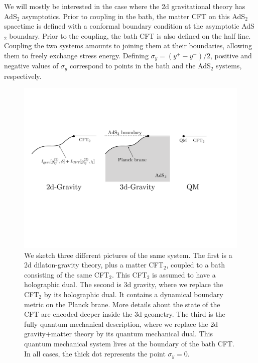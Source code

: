 \documentclass[12pt]{article}
\begin{document}
We will mostly be interested in the case where the 2d gravitational theory has AdS$_2$ asymptotics.
Prior to coupling in the bath, the matter CFT on this AdS$_2$ spacetime is defined with a conformal boundary condition at the asymptotic AdS$_2$ boundary. 
Prior to the coupling, the bath CFT is also defined on the half line. 
Coupling the two systems amounts to joining them at their boundaries, allowing them to freely exchange stress energy. 
Defining $\sigma_y = (y^+ - y^-)/2$, positive and negative values of $\sigma_y$ correspond to points in the bath and the AdS$_2$ systems, respectively. 
\begin{figure}[t]
    \begin{center}
    \includegraphics[scale=.48]{Figures/ThreePictures}
    \end{center}
    \caption{We sketch three different pictures of the same system.
    The first is a 2d dilaton-gravity theory, plus a matter CFT$_2$, coupled to a bath consisting of the same CFT$_2$. 
    This CFT$_2$ is assumed to have a holographic dual.
    The second is 3d gravity, where we replace the CFT$_2$ by its holographic dual.
    It contains a dynamical boundary metric on the Planck brane.  
    More details about the state of the CFT are encoded deeper inside the 3d geometry.
    The third is the fully quantum mechanical description, where we replace the 2d gravity+matter theory by its quantum mechanical dual. This quantum mechanical system lives at the boundary of the bath CFT.
    In all cases, the thick dot represents the point $\sigma_y=0$.}
    \label{ThreePictures}
\end{figure}
\end{document}
